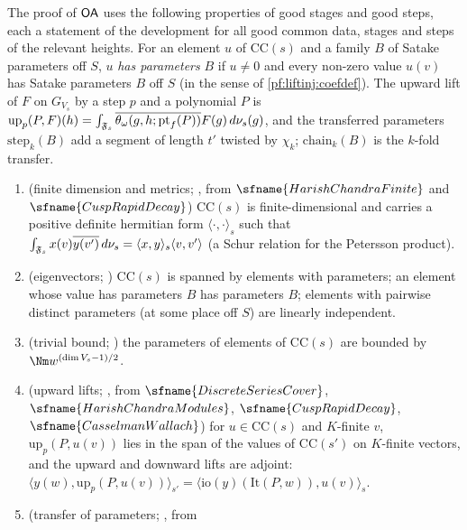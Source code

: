 The proof of $\mathsf{OA}$ uses the following properties of good stages and good steps, each a statement of the development for all good
common data, stages and steps of the relevant heights. For an element $u$ of $\mathrm{CC}(s)$ and a family $B$ of Satake parameters
off $S$, $u$ \emph{has parameters} $B$ if $u\ne0$ and every non-zero value $u(v)$ has Satake parameters $B$ off $S$ (in the sense of
\cref{pf:liftinj:coefdef}). The upward lift of $F$ on $G_{V_s}$ by a step $p$ and a polynomial $P$ is
$\mathrm{up}_p(P,F)(h)=\int_{\mathfrak F_s}\overline{\theta_\omega(g,h;\mathrm{pt}_f(P))}F(g)\,d\nu_s(g)$, and the transferred parameters
$\mathrm{step}_k(B)$ add a segment of length $t'$ twisted by $\chi_k$; $\mathrm{chain}_k(B)$ is the $k$-fold transfer.
\begin{enumerate}[label=(O\arabic*)]\sloppy
\item\label{pf:fs:O1} (finite dimension and metrics; ,
from $\sfname{HarishChandraFinite}$ and $\sfname{CuspRapidDecay}$) $\mathrm{CC}(s)$ is finite-dimensional and carries a positive
definite hermitian form $\langle\cdot,\cdot\rangle_s$ such that $\int_{\mathfrak F_s}x(v)\overline{y(v')}\,d\nu_s=\langle x,y\rangle_s\langle v,v'\rangle$
(a Schur relation for the Petersson product).
\item\label{pf:fs:O2} (eigenvectors; ) $\mathrm{CC}(s)$ is
spanned by elements with parameters; an element whose value has parameters $B$ has parameters $B$; elements with pairwise distinct
parameters (at some place off $S$) are linearly independent.
\item\label{pf:fs:O3} (trivial bound; ) the parameters of
elements of $\mathrm{CC}(s)$ are bounded by $\Nm w^{(\dim V_s-1)/2}$.
\item\label{pf:fs:O4} (upward lifts; , from $\sfname{DiscreteSeriesCover}$,
$\sfname{HarishChandraModules}$, $\sfname{CuspRapidDecay}$, $\sfname{CasselmanWallach}$) for $u\in\mathrm{CC}(s)$ and $K$-finite $v$,
$\mathrm{up}_p(P,u(v))$ lies in the span of the values of $\mathrm{CC}(s')$ on $K$-finite vectors, and the upward and downward lifts are
adjoint: $\langle y(w),\mathrm{up}_p(P,u(v))\rangle_{s'}=\langle\mathrm{io}(y)(\mathrm{It}(P,w)),u(v)\rangle_s$.
\item\label{pf:fs:O5} (transfer of parameters; , from

\end{enumerate}
